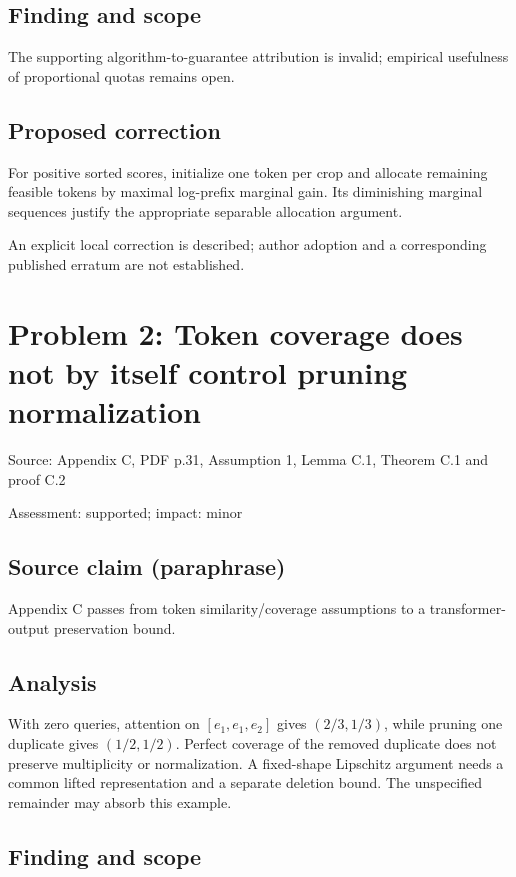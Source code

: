 \documentclass[11pt]{article}
\begin{document}
\subsection*{Finding and scope}

The supporting algorithm-to-guarantee attribution is invalid; empirical usefulness of proportional quotas remains open.

\subsection*{Proposed correction}

For positive sorted scores, initialize one token per crop and allocate remaining feasible tokens by maximal log-prefix marginal gain. Its diminishing marginal sequences justify the appropriate separable allocation argument.

An explicit local correction is described; author adoption and a corresponding published erratum are not established.

\section*{Problem 2: Token coverage does not by itself control pruning normalization}

Source: Appendix C, PDF p.31, Assumption 1, Lemma C.1, Theorem C.1 and proof C.2

Assessment: supported; impact: minor

\subsection*{Source claim (paraphrase)}

Appendix C passes from token similarity/coverage assumptions to a transformer-output preservation bound.

\subsection*{Analysis}

With zero queries, attention on \([e_1,e_1,e_2]\) gives \((2/3,1/3)\), while pruning one duplicate gives \((1/2,1/2)\). Perfect coverage of the removed duplicate does not preserve multiplicity or normalization. A fixed-shape Lipschitz argument needs a common lifted representation and a separate deletion bound. The unspecified remainder may absorb this example.

\subsection*{Finding and scope}
\end{document}
